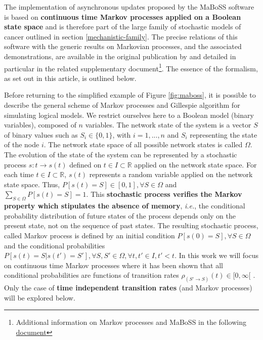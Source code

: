 \documentclass[a4paper,12pt,twoside,onecolumn,openright,final,oldfontcommands]{memoir}
\begin{document}
The implementation of asynchronous updates proposed by the MaBoSS
software is based on \textbf{continuous time Markov processes applied on
a Boolean state space} and is therefore part of the large family of
stochastic models of cancer outlined in section
\ref{mechanistic-family}. The precise relations of this software with
the generic results on Markovian processes, and the associated
demonstrations, are available in the original publication by
\citet{stoll2012continuous} and detailed in particular in the related
supplementary document\footnote{Additional information on Markov
  processes and MaBoSS in the following
  \href{https://static-content.springer.com/esm/art\%3A10.1186\%2F1752-0509-6-116/MediaObjects/12918_2012_969_MOESM1_ESM.pdf}{document}}.
The essence of the formalism, as set out in this article, is outlined
below.

Before returning to the simplified example of Figure \ref{fig:maboss},
it is possible to describe the general scheme of Markov processes and
Gillespie algorithm for simulating logical models. We restrict ourselves
here to a Boolean model (binary variables), composed of \(n\) variables.
The network state of the system is a vector \(S\) of binary values such
as \(S_i \in \{0, 1\}\), with \(i=1,...,n\) and \(S_i\) representing the
state of the node \(i\). The network state space of all possible network
states is called \(\Omega\). The evolution of the state of the system
can be represented by a stochastic process \(s:t \rightarrow s(t)\)
defined on \(t \in I \subset \mathbb{R}\) applied on the network state
space. For each time \(t \in I \subset \mathbb{R}\), \(s(t)\) represents
a random variable applied on the network state space. Thus,
\(P[s(t)=S]\in[0, 1], \forall S \in \Omega\) and
\(\sum_{S \in \Omega} P[s(t)=S] = 1\). This \textbf{stochastic process
verifies the Markov property which stipulates the absence of memory},
\emph{i.e.}, the conditional probability distribution of future states
of the process depends only on the present state, not on the sequence of
past states. The resulting stochastic process, called Markov process is
defined by an initial condition \(P[s(0)=S], \forall S \in \Omega\) and
the conditional probabilities
\(P[s(t)=S|s(t')=S'], \forall S,S' \in \Omega, \forall t,t' \in I, t'<t\).
In this work we will focus on continuous time Markov processes where it
has been shown that all conditional probabilities are functions of
transition rates \(\rho_{(S' \rightarrow S)} (t) \in [0, \infty[\)
\citep{van2004stochastic}. Only the case of \textbf{time independent
transition rates} (and Markov processes) will be explored below.
\end{document}
